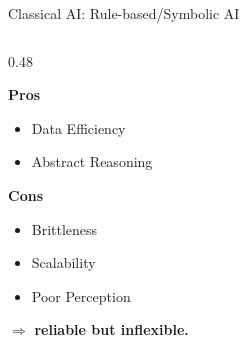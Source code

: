 \documentclass[10pt, aspectratio=169]{beamer}
\begin{document}
\begin{frame}{Classical AI: Rule-based/Symbolic AI}
\begin{columns}[T]
\begin{column}{0.48\textwidth}
\begin{exampleblock}{\textbf{Pros}}
\begin{itemize}
          \item Data Efficiency
          \item Abstract Reasoning
        \end{itemize}
      \end{exampleblock}
      \pause
      \begin{alertblock}{\textbf{Cons}}
        \begin{itemize}
          \item Brittleness
          \item Scalability
          \item Poor Perception
        \end{itemize}
      \end{alertblock}
      \vspace{0.3cm}
      \pause
      $\boldsymbol{\Rightarrow}$ \textbf{reliable but inflexible.}
    \end{column}
  \end{columns}
\end{frame}
\end{document}
